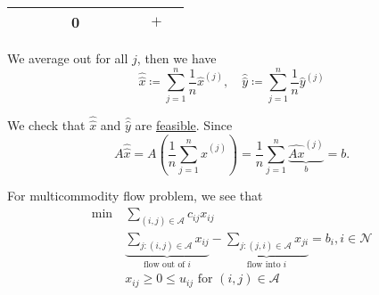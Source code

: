 \begin{explanation}
\begin{table}[H]
\begin{tabular}{c|ccccc|ccccc}
			           &                                           &                                                    &                   & 0            &            &                                                        &            &                                                                                  & \(+\)      &            \\
			\bottomrule
		\end{tabular}
	\end{table}
	\begin{intuition}
		We average out for all \(j\), then we have
		\[
			\hat{\hat{x}} \coloneqq \sum\limits_{j=1}^{n} \frac{1}{n}\hat{x}^{(j)},\quad \hat{\hat{y}} \coloneqq \sum\limits_{j=1}^{n} \frac{1}{n}\hat{y}^{(j)}
		\]
	\end{intuition}

	We check that \(\hat{\hat{x}}\) and \(\hat{\hat{y}}\) are \hyperref[def:feasible-solution]{feasible}. Since
	\[
		A\hat{\hat{x}} = A\left( \frac{1}{n}\sum\limits_{j=1}^{n} \hat{x}^{(j)} \right) = \frac{1}{n}\sum\limits_{j=1}^{n} \underbrace{\hat{Ax}^{(j)}}_{b} = b.
	\]
\end{explanation}

\begin{problem}
For multicommodity flow problem, we see that
\[
	\begin{aligned}
		\min~ & \sum\limits_{(i, j)\in \mathcal{A}} c_{ij}x_{ij}                                                                                                                                                     \\
		      & \underbrace{\sum\limits_{j\colon (i, j)\in\mathcal{A}} x_{ij}}_{\text{flow out of }i} - \underbrace{\sum\limits_{j\colon (j, i)\in\mathcal{A}} x_{ji}}_{\text{flow into }i}  = b_i, i \in\mathcal{N} \\
		      & x_{ij}\geq 0 \leq u_{ij} \text{ for }(i, j)\in\mathcal{A}
	\end{aligned}
\]
\end{problem}

